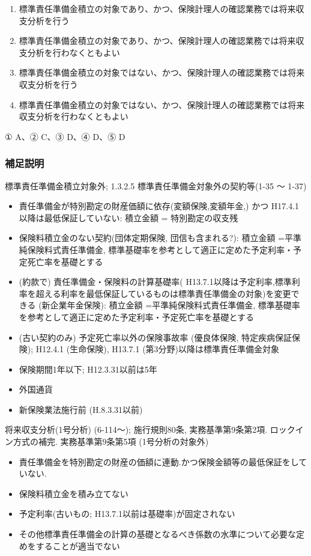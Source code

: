 \documentclass[report,gutter=10mm,fore-edge=10mm,uplatex,dvipdfmx]{jlreq}
\begin{document}
\begin{enumerate} [A ]
\item 標準責任準備金積立の対象であり、かつ、保険計理人の確認業務では将来収支分析を行う
\item 標準責任準備金積立の対象であり、かつ、保険計理人の確認業務では将来収支分析を行わなくともよい
\item 標準責任準備金積立の対象ではない、かつ、保険計理人の確認業務では将来収支分析を行う
\item 標準責任準備金積立の対象ではない、かつ、保険計理人の確認業務では将来収支分析を行わなくともよい
\end{enumerate}


① A、② C、③ D、④ D、⑤ D

\subsubsection{補足説明}

標準責任準備金積立対象外; 1.3.2.5 標準責任準備金対象外の契約等(1-35 〜 1-37)
\begin{itemize}
 \item 責任準備金が特別勘定の財産価額に依存(変額保険,変額年金,) かつ H17.4.1以降は最低保証していない: 積立金額 = 特別勘定の収支残
 \item 保険料積立金のない契約(団体定期保険, 団信も含まれる?): 積立金額 =平準純保険料式責任準備金, 標準基礎率を参考として適正に定めた予定利率・予定死亡率を基礎とする
 \item  (約款で) 責任準備金・保険料の計算基礎率( H13.7.1以降は予定利率,標準利率を超える利率を最低保証しているものは標準責任準備金の対象)を変更できる (新企業年金保険): 積立金額 =平準純保険料式責任準備金, 標準基礎率を参考として適正に定めた予定利率・予定死亡率を基礎とする
 \item (古い契約のみ) 予定死亡率以外の保険事故率 (優良体保険, 特定疾病保証保険); H12.4.1 (生命保険), H13.7.1 (第3分野)以降は標準責任準備金対象
 \item 保険期間1年以下; H12.3.31以前は5年
 \item 外国通貨
 \item 新保険業法施行前 (H.8.3.31以前)
\end{itemize}

将来収支分析(1号分析) (6-114〜); 施行規則80条, 実務基準第9条第2項. ロックイン方式の補完. 
実務基準第9条第5項 (1号分析の対象外)

\begin{itemize}
 \item 責任準備金を特別勘定の財産の価額に連動.かつ保険金額等の最低保証をしていない. 
 \item 保険料積立金を積み立てない
 \item 予定利率(古いもの; H13.7.1以前は基礎率)が固定されない
 \item その他標準責任準備金の計算の基礎となるべき係数の水準について必要な定めをすることが適当でない
\end{itemize}
\end{document}
